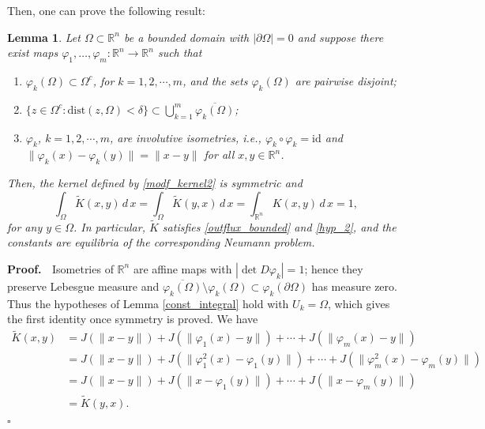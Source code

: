 \documentclass[a4paper,12pt]{amsart}
\newtheorem{lemma}[theorem]{Lemma}
\renewcommand{\proof}{{\noindent \bf Proof. \ }}
\newcommand{\eproof}{\hfill \mbox{${\square}$}}
\newcommand{\R}{\mathbb{R}}
\newcommand{\dist}{\textrm{dist}}
\begin{document}
    Then, one can prove the following result:
  \begin{lemma} \label{modf_kernel_isometry}
   Let $\Omega \subset \R^n$ {be a bounded domain with $|\partial\Omega| = 0$} and suppose there exist maps
    ${\varphi_1}, \dots, {\varphi_{{m}}}: {\R^n \to \R^n}$ such that
 \begin{enumerate}
  \item $\varphi_k(\Omega ) \subset \Omega^c$, for $k=1,2, \cdots, {m}$, {and the sets $\varphi_k(\Omega)$ are pairwise disjoint;}
   \item {$\{ z \in \Omega^c : \dist(z, \Omega) < \delta \} \subset \bigcup_{k=1}^m \overline{\varphi_k(\Omega)}$;}
 \item  $ \varphi_k$, $k=1,2, \cdots, {m}$,   are {involutive} isometries, i.e., $\varphi_k \circ \varphi_k = \textrm{id}$ and $\|\varphi_k(x) - \varphi_k(y)\| = \|x-y\| $ {for all $x, y \in \R^n$}.
  \end{enumerate}
  Then,  the kernel defined by {\eqref{modf_kernel2}}
  is  symmetric and
  \[ \int_{\Omega}   \tilde{K}(x,y)\, d \,x  = {\int_{\Omega}   \tilde{K}(y,x)\, d \,x =}    \int_{\R^n}   K(x,y)\, d \,x =1,\]
  for any $y \in  \Omega$. {In particular, $\tilde K$ satisfies \eqref{outflux_bounded} and \eqref{hyp_2}, and the constants are equilibria of the corresponding Neumann problem.}
     \end{lemma}
  \proof {Isometries of $\R^n$ are affine maps with $|\det D\varphi_k| = 1$; hence they preserve Lebesgue measure and $\overline{\varphi_k(\Omega)} \setminus \varphi_k(\Omega) \subset \varphi_k(\partial\Omega)$ has measure zero. Thus the hypotheses of Lemma \ref{const_integral} hold with $U_k = \Omega$, which gives the first identity once symmetry is proved.} We have
  \begin{align*}
  \tilde{K}(x,y) & = J(\|x-y\|) +  J(\| \varphi_1(x)- y \|) + \cdots  +  J(\| \varphi_{{m}}(x)- y \|)  \\
   & = J(\|x-y\|) +  J(\| \varphi_1^2(x)- \varphi_1(y) \|) + \cdots  +  J(\| \varphi_{{m}}^2(x)- \varphi_{{m}}(y) \|)  \\
   & = J(\|x-y\|) +  J(\| x - \varphi_1(y) \|) + \cdots  +  J(\| x- \varphi_{{m}}(y) \|)  \\
   & = \tilde{K}(y,x).
  \end{align*}
  \eproof
\end{document}
